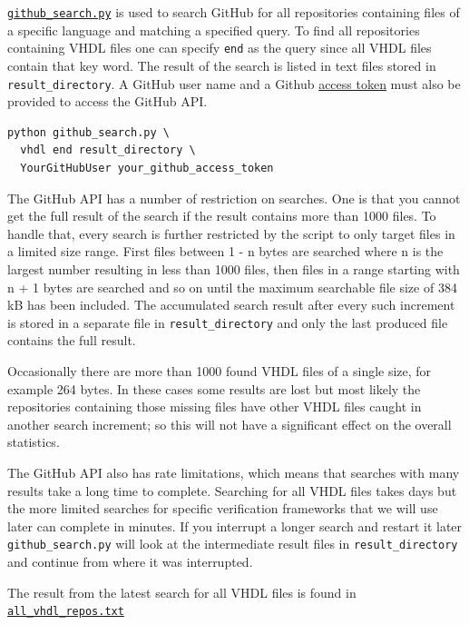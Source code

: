 \documentclass[]{report}
\begin{document}
\href{https://github.com/LarsAsplund/github-facts/tree/main/py/github_search.py}{\texttt{github\_search.py}} is used to search GitHub for all repositories containing files of a specific language and matching a specified query. To find all repositories containing VHDL files one can specify \texttt{end} as the query since all VHDL files contain that key word. The result of the search is listed in text files stored in \texttt{result\_directory}. A GitHub user name and a Github \href{https://help.github.com/en/github/authenticating-to-github/creating-a-personal-access-token-for-the-command-line}{access token} must also be provided to access the GitHub API.

\begin{verbatim}
python github_search.py \
  vhdl end result_directory \
  YourGitHubUser your_github_access_token
\end{verbatim}

The GitHub API has a number of restriction on searches. One is that you cannot get the full result of the search if the result contains more than 1000 files. To handle that, every search is further restricted by the script to only target files in a limited size range. First files between 1 - n bytes are searched where n is the largest number resulting in less than 1000 files, then files in a range starting with n + 1 bytes are searched and so on until the maximum searchable file size of 384 kB has been included. The accumulated search result after every such increment is stored in a separate file in \texttt{result\_directory} and only the last produced file contains the full result.

Occasionally there are more than 1000 found VHDL files of a single size, for example 264 bytes. In these cases some results are lost but most likely the repositories containing those missing files have other VHDL files caught in another search increment; so this will not have a significant effect on the overall statistics.

The GitHub API also has rate limitations, which means that searches with many results take a long time to complete. Searching for all VHDL files takes days but the more limited searches for specific verification frameworks that we will use later can complete in minutes. If you interrupt a longer search and restart it later \texttt{github\_search.py} will look at the intermediate result files in \texttt{result\_directory} and continue from where it was interrupted.

The result from the latest search for all VHDL files is found in \href{https://github.com/LarsAsplund/github-facts/tree/main/all_vhdl_repos.txt}{\texttt{all\_vhdl\_repos.txt}}
\end{document}
